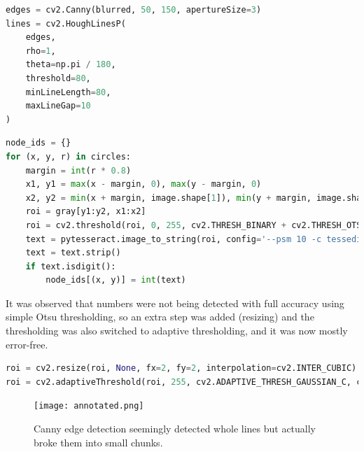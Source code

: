 \documentclass{article}
\begin{document}
\begin{lstlisting}[language=Python, caption=Detecting edges]
edges = cv2.Canny(blurred, 50, 150, apertureSize=3)
lines = cv2.HoughLinesP(
    edges,
    rho=1,
    theta=np.pi / 180,
    threshold=80,
    minLineLength=80,
    maxLineGap=10
)
\end{lstlisting}

\begin{lstlisting}[language=Python, caption=Extracting the nodes with the numbering]
node_ids = {}
for (x, y, r) in circles:
    margin = int(r * 0.8)
    x1, y1 = max(x - margin, 0), max(y - margin, 0)
    x2, y2 = min(x + margin, image.shape[1]), min(y + margin, image.shape[0])
    roi = gray[y1:y2, x1:x2]
    roi = cv2.threshold(roi, 0, 255, cv2.THRESH_BINARY + cv2.THRESH_OTSU)[1]
    text = pytesseract.image_to_string(roi, config='--psm 10 -c tessedit_char_whitelist=0123456789')
    text = text.strip()
    if text.isdigit():
        node_ids[(x, y)] = int(text)
\end{lstlisting}

It was observed that numbers were not being detected with full accuracy using simple Otsu thresholding, so an extra step was added (resizing) and the thresholding was also switched to adaptive thresholding, and it was now mostly error-free.

\begin{lstlisting}[language=Python, caption=Extra steps added in preprocessing]
roi = cv2.resize(roi, None, fx=2, fy=2, interpolation=cv2.INTER_CUBIC)
roi = cv2.adaptiveThreshold(roi, 255, cv2.ADAPTIVE_THRESH_GAUSSIAN_C, cv2.THRESH_BINARY_INV, 11, 2)
\end{lstlisting}

\begin{figure}[h!]
    \centering
    \texttt{[image: annotated.png]}
    \caption{Canny edge detection seemingly detected whole lines but actually broke them into small chunks.}
    \label{fig:example}
\end{figure}
\end{document}
